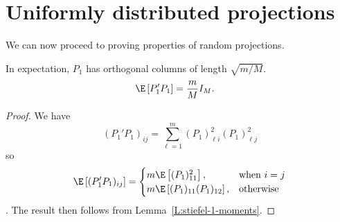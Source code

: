 \section{Uniformly distributed projections}

We can now proceed to proving properties of random projections.  


\begin{lemma}\label{L:projection-m1}
    In expectation, $P_1$ has orthogonal columns of length $\sqrt{m/M}$.
    \begin{align*}
        \E \left[ P_1' P_1 \right] &= \frac{m}{M} I_M.
    \end{align*}
\end{lemma}
\begin{proof}
    We have
    \[
        (P_1' P_1)_{ij} 
        =
        \sum_{\ell=1}^m (P_1)_{\ell i}^2 (P_1)_{\ell j}^2
    \]
    so
    \[
        \E \left[ (P_1' P_1)_{ij} \right] 
        =
        \begin{cases}
            m \E \left[ (P_1)_{11}^2 \right], &\text{when $i = j$} \\
            m \E \left[ (P_1)_{11} (P_1)_{12} \right], &\text{otherwise}
        \end{cases}
    \].
    The result then follows from Lemma~\ref{L:stiefel-1-moments}.
\end{proof}


